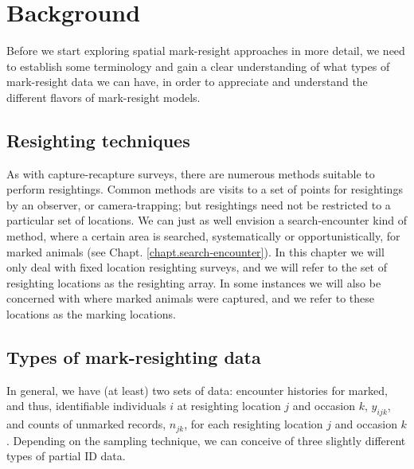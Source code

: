 \section{Background}
Before we start exploring spatial mark-resight approaches in more detail, we
need to establish some terminology and gain a clear understanding of what types of mark-resight data we can
have, in order to appreciate and understand the different flavors of
mark-resight models.  

\subsection{Resighting techniques}
As with capture-recapture surveys, there
are numerous
methods suitable to perform resightings. Common methods are visits to a set of points for resightings by an observer, or camera-trapping; but resightings need not be restricted to a particular set of locations. We can just as well envision a search-encounter kind of method, where a certain area is searched, systematically or opportunistically, for marked animals (see Chapt. \ref{chapt.search-encounter}). In this chapter we will only deal with fixed location resighting surveys, and we will refer to the set of resighting locations as the resighting array. In some instances we will also be concerned with where marked animals were captured, and we refer to these locations as the marking locations.

\subsection{Types of mark-resighting data}

In general, we have (at least) two sets of data:
encounter histories for marked, and thus,
identifiable
individuals $i$ at resighting location $j$ and
occasion $k$, $y_{ijk}$, and counts of
unmarked records, $n_{jk}$,  
for each resighting location
$j$ and occasion $k$.
Depending on the sampling technique, we can
conceive of three slightly different types of partial ID data.


